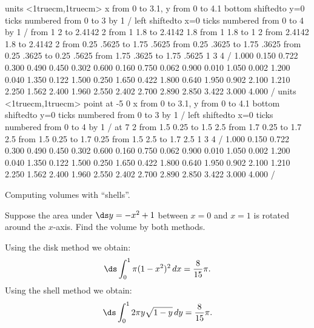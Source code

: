 \figure[H]
\centerline{\vbox{\beginpicture
\normalgraphs
\setcoordinatesystem units <1truecm,1truecm>
\setplotarea x from 0 to 3.1, y from 0 to 4.1
\axis bottom shiftedto y=0 ticks numbered from 0 to 3 by 1 /
\axis left shiftedto x=0 ticks numbered from 0 to 4 by 1 /
\putrule from 1 2 to 2.4142 2
\putrule from 1 1.8 to 2.4142 1.8
\putrule from 1 1.8 to 1 2
\putrule from 2.4142 1.8 to 2.4142 2
\putrule from 0.25 .5625 to 1.75 .5625
\putrule from 0.25 .3625 to 1.75 .3625
\putrule from 0.25 .3625 to 0.25 .5625
\putrule from 1.75 .3625 to 1.75 .5625
 1 3 4 /
\setquadratic
{} 1.000 0.150 0.722 0.300 0.490 0.450 0.302 0.600 0.160 
0.750 0.062 0.900 0.010 1.050 0.002 1.200 0.040 1.350 0.122 
1.500 0.250 1.650 0.422 1.800 0.640 1.950 0.902 2.100 1.210 
2.250 1.562 2.400 1.960 2.550 2.402 2.700 2.890 2.850 3.422 
3.000 4.000 /
\setcoordinatesystem units <1truecm,1truecm> point at -5 0
\setplotarea x from 0 to 3.1, y from 0 to 4.1
\axis bottom shiftedto y=0 ticks numbered from 0 to 3 by 1 /
\axis left shiftedto x=0 ticks numbered from 0 to 4 by 1 /
 at 7 2
\putrule from 1.5 0.25 to 1.5 2.5
\putrule from 1.7 0.25 to 1.7 2.5
\putrule from 1.5 0.25 to 1.7 0.25
\putrule from 1.5 2.5 to 1.7 2.5
\setlinear
{} 1 3 4 /
\setquadratic
{} 1.000 0.150 0.722 0.300 0.490 0.450 0.302 0.600 0.160 
0.750 0.062 0.900 0.010 1.050 0.002 1.200 0.040 1.350 0.122 
1.500 0.250 1.650 0.422 1.800 0.640 1.950 0.902 2.100 1.210 
2.250 1.562 2.400 1.960 2.550 2.402 2.700 2.890 2.850 3.422 
3.000 4.000 /
\endpicture}}
\caption{\label{fig:shell method}
Computing volumes with ``shells''.}
\endfigure

\begin{example}{}{}\label{}
Suppose the area under $\ds y=-x^2+1$ between $x=0$ and $x=1$ is
rotated around the $x$-axis. Find the volume by both methods.
\end{example}

\begin{solution}
Using the disk method we obtain:
$$\ds \int_0^1 \pi(1-x^2)^2\,dx={8\over15}\pi.$$
Using the shell method we obtain:
$$\ds \int_0^1 2\pi y \sqrt{1-y}\,dy={8\over15}\pi.$$
\end{solution}


